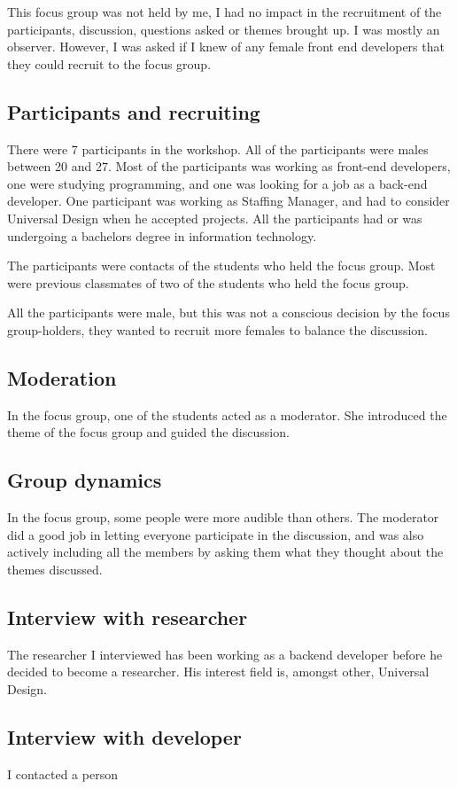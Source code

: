 This focus group was not held by me, I had no impact in the recruitment of the participants, discussion, questions asked or themes brought up. I was mostly an observer. However, I was asked if I knew of any female front end developers that they could recruit to the focus group.

\subsection{Participants and recruiting}
There were 7 participants in the workshop. All of the participants were males between 20 and 27. Most of the participants was working as front-end developers, one were studying programming, and one was looking for a job as a back-end developer. One participant was working as Staffing Manager, and had to consider Universal Design when he accepted projects. All the participants had or was undergoing a bachelors degree in information technology.

The participants were contacts of the students who held the focus group. Most were previous classmates of two of the students who held the focus group.

All the participants were male, but this was not a conscious decision by the focus group-holders, they wanted to recruit more females to balance the discussion.

\subsection{Moderation}
In the focus group, one of the students acted as a moderator. She introduced the theme of the focus group and guided the discussion.

\subsection{Group dynamics}
In the focus group, some people were more audible than others. The moderator did a good job in letting everyone participate in the discussion, and was also actively including all the members by asking them what they thought about the themes discussed.



\subsection{Interview with researcher}
The researcher I interviewed has been working as a backend developer before he decided to become a researcher. His interest field is, amongst other, Universal Design.

\subsection{Interview with developer}
I contacted a person 